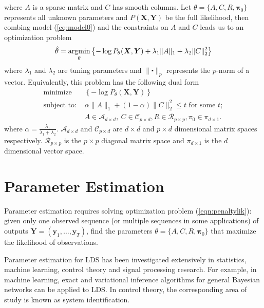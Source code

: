 \documentclass[fleqn,12pt]{article}
\let\oldref\ref
\renewcommand{\ref}[1]{(\oldref{#1})}
\newcommand{\argmin}{\operatornamewithlimits{argmin}}
\providecommand{\mb}[1]{\boldsymbol{#1}}
\newcommand{\by}{\mb{y}}
\newcommand{\bX}{\mb{X}}
\newcommand{\bY}{\mb{Y}}
\begin{document}
where $A$ is a sparse matrix and $C$ has smooth columns.
Let $\theta =\{A,C,R,\mathbf{\pi}_0\}$ represents all unknown parameters and $P(\bX,\bY)$ be the full likelihood, then combing model \ref{eq:model0} and the constraints on $A$ and $C$ leads us to an optimization problem
\begin{equation}\label{eqn:penaltylik}
\hat{\theta}=\argmin_{\substack{\theta}}\left\{-\log P_\theta(\bX,\bY)+\lambda_1\|A\|_1+\lambda_2\|C\|_2^2\right\}
\end{equation}
where $\lambda_1$ and $\lambda_2$ are tuning parameters and $\|\centerdot\|_p$ represents the $p$-norm of a vector. Equivalently, this problem has the following dual form
\begin{equation*}\label{eqn:penaltylikdual}
\begin{aligned}
&\text{minimize}&\left\{-\log P_\theta(\bX,\bY)\right\}&\\
&\text{subject to: }
& \alpha\|A\|_1+ (1-\alpha)\|C\|_2^2 \leq t \text{ for some }t; &\\
&& A\in \mathcal{A}_{d\times d},\ C \in \mathcal{C}_{p \times d}, R \in \mathcal{R}_{p\times p}, \pi_0 \in \mathcal{\pi}_{d\times 1}.&
\end{aligned}
\end{equation*}
where $\alpha = \frac{\lambda_1}{\lambda_1 + \lambda_2}$. $\mathcal{A}_{d\times d}$ and $\mathcal{C}_{p \times d}$ are $d\times d$ and $p \times d$ dimensional matrix spaces respectively. $\mathcal{R}_{p \times p}$ is the $p \times p$ diagonal matrix space and $\mathcal{\pi}_{d\times 1}$ is the $d$ dimensional vector space.
\section{Parameter Estimation}
Parameter estimation requires solving optimization problem \ref{eqn:penaltylik}: given only one observed sequence (or multiple sequences in some applications) of outputs $\bY=(\by_1,\ldots,\by_T)$, find the parameters $\theta=\{A,C,R,\mathbf{\pi}_0\}$ that maximize the likelihood of observations.

Parameter estimation for LDS has been investigated extensively in statistics, machine learning, control theory and signal processing research. For example, in machine learning, exact and variational inference algorithms for general Bayesian networks can be applied to LDS. In control theory, the corresponding area of study is known as system identification.
\end{document}
